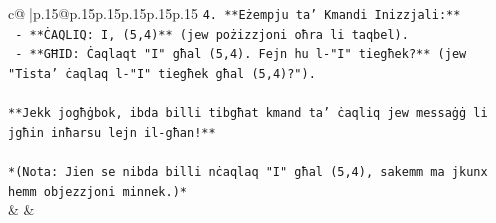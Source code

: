 \documentclass{article}
\begin{document}
{\begin{supertabular}{c@{$\;$}|p{.15\linewidth}@{}p{.15\linewidth}p{.15\linewidth}p{.15\linewidth}p{.15\linewidth}p{.15\linewidth}}
{{{\texttt{4. **Eżempju ta' Kmandi Inizzjali:**} \\
\texttt{   {-} **ĊAQLIQ: I, (5,4)** (jew pożizzjoni oħra li taqbel).} \\
\texttt{   {-} **GĦID: Ċaqlaqt "I" għal (5,4). Fejn hu l{-}"I" tiegħek?** (jew "Tista' ċaqlaq l{-}"I" tiegħek għal (5,4)?").} \\
\\ 
\texttt{**Jekk jogħġbok, ibda billi tibgħat kmand ta' ċaqliq jew messaġġ li jgħin inħarsu lejn il{-}għan!**} \\
\\ 
\texttt{*(Nota: Jien se nibda billi nċaqlaq "I" għal (5,4), sakemm ma jkunx hemm objezzjoni minnek.)*} \\
            }
        }
    }
    & & \\ \\


\end{supertabular}}
\end{document}
